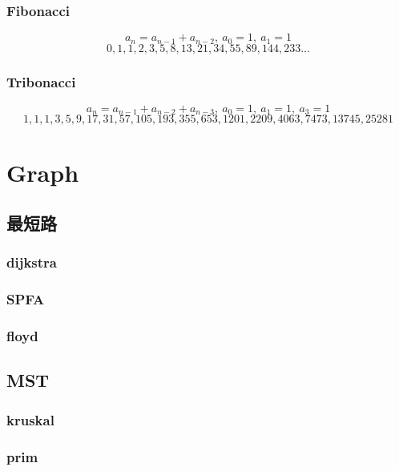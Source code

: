 \subsubsection{Fibonacci}
\[a_{n} = a_{n-1} + a_{n-2},\ a_0 = 1,\ a_1 = 1\]
\[0, 1, 1, 2, 3, 5, 8, 13, 21, 34, 55, 89, 144, 233...\]

\subsubsection{Tribonacci}
\[a_{n} = a_{n-1} + a_{n-2} + a_{n-3},\ a_0 = 1,\ a_1 = 1,\ a_3 = 1\]
\[1, 1, 1, 3, 5, 9, 17, 31, 57, 105, 193, 355, 653, 1201, 2209, 4063, 7473, 13745, 25281\]

\section{Graph}

\subsection{最短路}
\subsubsection{dijkstra}


\subsubsection{SPFA}


\subsubsection{floyd}


\subsection{MST}
\subsubsection{kruskal}


\subsubsection{prim}



